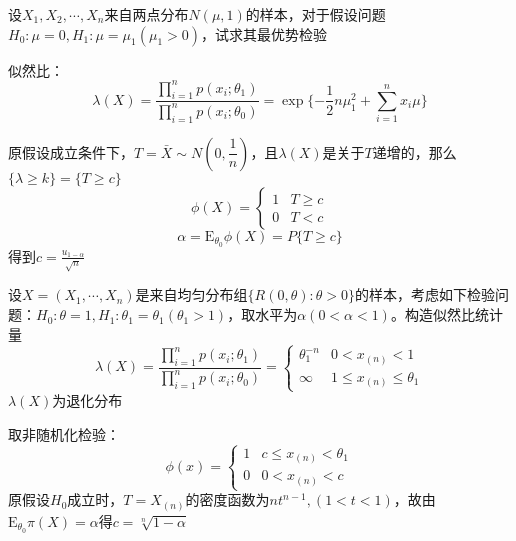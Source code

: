 \begin{example}
    设$X_1,X_2,\cdots,X_n$来自两点分布$N(\mu,1)$的样本，对于假设问题$H_0:\mu =0,H_1:\mu = \mu_1(\mu_1>0)$，试求其最优势检验

    似然比：
    \[
        \lambda(X) = \dfrac{\prod_{i = 1}^{n}p(x_i;\theta_1)}{\prod_{i = 1}^{n}p(x_i;\theta_0)} = \exp\{ -\dfrac{1}{2}n\mu_1^2 + \sum_{i = 1}^{n}x_i\mu \}
    \]

    原假设成立条件下，$T = \bar{X}\sim N(0,\dfrac{1}{n})$，且$\lambda(X)$是关于$T$递增的，那么$\{\lambda\geq k\} = \{T\geq c\}$
    \[
        \phi(X) = \left\{
            \begin{array}{ll}
                1 & T \geq c\\
                0 & T < c
            \end{array}
        \right.
    \]
    \[
        \alpha = \mathrm{E}_{\theta_0}\phi(X) = P\{T\geq c\}
    \]
    得到$c = \frac{u_{1-\alpha}}{\sqrt{n}}$
\end{example}
\begin{example}
    设$X = (X_1,\cdots,X_n)$是来自均匀分布组$\{ R(0,\theta):\theta>0 \}$的样本，考虑如下检验问题：$H_0:\theta = 1,H_1:\theta_1 = \theta_1(\theta_1>1)$，取水平为$\alpha(0<\alpha<1)$。构造似然比统计量
    \[
        \lambda(X) = \dfrac{\prod_{i = 1}^{n}p(x_i;\theta_1)}{\prod_{i = 1}^{n}p(x_i;\theta_0)} = \left\{
            \begin{array}{ll}
                \theta_1^{-n} & 0<x_{(n)}<1\\
                \infty & 1\leq x_{(n)} \leq \theta_1 
            \end{array}
        \right.
    \]
    $\lambda(X)$为退化分布

    取非随机化检验：
    \[
        \phi(x) = \left\{
            \begin{array}{ll}
                1 & c\leq x_{(n)}<\theta_1\\
                0 & 0<x_{(n)}<c
            \end{array}
        \right.
    \]
    原假设$H_0$成立时，$T = X_{(n)}$的密度函数为$nt^{n-1},(1<t<1)$，故由$\mathrm{E}_{\theta_0}\pi(X) = \alpha$得$c = \sqrt[n]{1-\alpha}$
\end{example}
